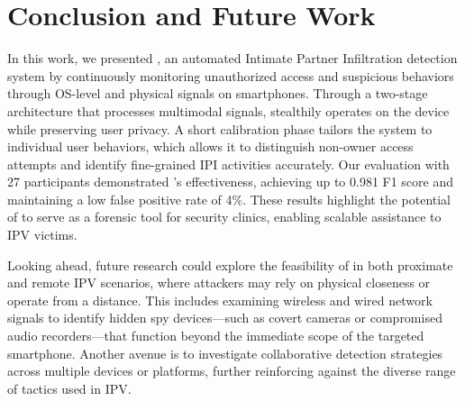 \section{Conclusion and Future Work}\label{sec-8-conclusion}

In this work, we presented \sys, an automated Intimate Partner Infiltration  detection system by continuously monitoring unauthorized access and suspicious behaviors through OS-level and physical signals on smartphones. Through a two-stage architecture that processes multimodal signals, \sys stealthily operates on the device while preserving user privacy. A short calibration phase tailors the system to individual user behaviors, which allows it to distinguish non-owner access attempts and identify fine-grained IPI activities accurately. Our evaluation with 27 participants demonstrated \sys’s effectiveness, achieving up to 0.981 F1 score and maintaining a low false positive rate of 4\%. These results highlight the potential of \sys to serve as a forensic tool for security clinics, enabling scalable assistance to IPV victims.

Looking ahead, future research could explore the feasibility of \sys in both proximate and remote IPV scenarios, where attackers may rely on physical closeness or operate from a distance. This includes examining wireless and wired network signals to identify hidden spy devices—such as covert cameras or compromised audio recorders—that function beyond the immediate scope of the targeted smartphone. Another avenue is to investigate collaborative detection strategies across multiple devices or platforms, further reinforcing \sys against the diverse range of tactics used in IPV.